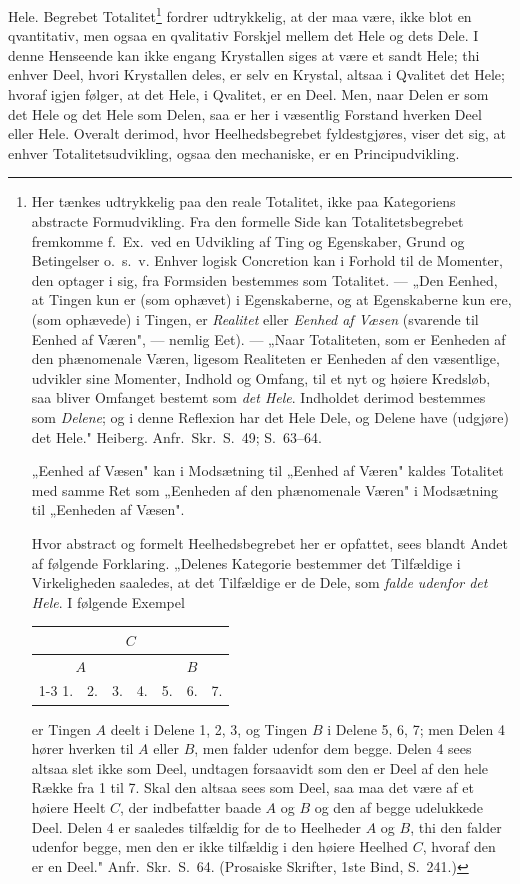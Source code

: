 \documentclass[12pt]{book}
\newcommand{\opage}[1]{\marginnote{\footnotesize\textit{[#1]}}}
\begin{document}
Hele. Begrebet Totalitet\footnote{Her tænkes udtrykkelig paa den reale Totalitet, ikke
paa Kategoriens abstracte Formudvikling. Fra den formelle Side kan Totalitetsbegrebet
fremkomme f.\ Ex.\ ved en Udvikling af Ting og Egenskaber, Grund og Betingelser o.\ s.\
v. Enhver logisk Concretion kan i Forhold til de Momenter, den optager i sig, fra
Formsiden bestemmes som Totalitet. --- „Den Eenhed, at Tingen kun er (som ophævet) i
Egenskaberne, og at Egenskaberne kun ere, (som ophævede) i Tingen, er \emph{Realitet}
eller \emph{Eenhed af Væsen} (svarende til Eenhed af Væren", --- nemlig Eet). --- „Naar
Totaliteten, som er Eenheden af den phænomenale Væren, ligesom Realiteten er Eenheden af
den væsentlige, udvikler sine Momenter, Indhold og Omfang, til et nyt og høiere Kredsløb,
saa bliver Omfanget bestemt som \emph{det Hele}. Indholdet derimod bestemmes som
\emph{Delene}; og i denne Reflexion har det Hele Dele, og Delene have (udgjøre) det Hele."
Heiberg. Anfr.\ Skr.\ S.~49; S.~63--64.

„Eenhed af Væsen" kan i Modsætning til „Eenhed af Væren" kaldes Totalitet med samme Ret
som „Eenheden af den phænomenale Væren" i Modsætning til „Eenheden af Væsen".

Hvor abstract og formelt Heelhedsbegrebet her er opfattet, sees blandt Andet af følgende
Forklaring. „Delenes Kategorie bestemmer det Tilfældige i Virkeligheden saaledes, at det
Tilfældige er de Dele, som \emph{falde udenfor det Hele}. I følgende Exempel

{\par\centering
\begin{tabular}{ccccccc}
\multicolumn{7}{c}{$C$}\\ \hline
\multicolumn{3}{c}{$A$} && \multicolumn{3}{c}{$B$}\\ \cline{1-3}\cline{5-7}
1.&2.&3.&4.&5.&6.&7.
\end{tabular}
\par}

\noindent er Tingen $A$ deelt i Delene 1, 2, 3, og Tingen $B$ i Delene 5, 6, 7; men Delen
4 hører hverken til $A$ eller $B$, men falder udenfor dem begge. Delen 4 sees altsaa slet
ikke som Deel, undtagen forsaavidt som den er Deel af den hele Række fra 1 til 7. Skal den
altsaa sees som Deel, saa maa det være af et høiere Heelt $C$, der indbefatter baade $A$
og $B$ og den af begge udelukkede Deel. Delen 4 er saaledes tilfældig for de to Heelheder
$A$ og $B$, thi den falder udenfor begge, men den er ikke tilfældig i den høiere Heelhed
$C$, hvoraf den er en Deel." Anfr.\ Skr.\ S.~64. (Prosaiske Skrifter, 1ste Bind,
S.~241.)} fordrer udtrykkelig, at der maa
\opage{129} være, ikke blot en qvantitativ, men ogsaa en qvalitativ Forskjel mellem det Hele og dets
Dele. I denne Henseende kan ikke engang Krystallen siges at være et sandt Hele; thi
enhver Deel, hvori Krystallen deles, er selv en Krystal, altsaa i Qvalitet det Hele;
hvoraf igjen følger, at det Hele, i Qvalitet, er en Deel. Men, naar Delen er som det Hele
og det Hele som Delen, saa er her i væsentlig Forstand hverken Deel eller Hele. Overalt
derimod, hvor Heelhedsbegrebet fyldestgjøres, viser det sig, at enhver Totalitetsudvikling,
ogsaa den mechaniske, er en Principudvikling.
\end{document}
